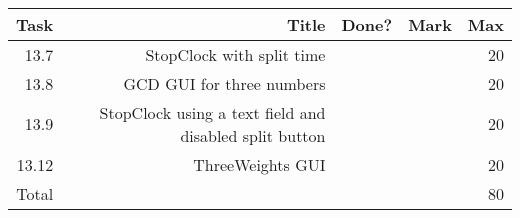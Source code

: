 \\ \\ \\ \noindent\parbox[l]{\textwidth}{
 \\ \\
\begin{tabular}{||r|r|r|r|r||} \hline \hline
Task  & Title                            & Done? & Mark & Max \\ \hline
13.7 & StopClock with split time & & & 20 \\ \hline
13.8 & GCD GUI for three numbers & & & 20 \\ \hline
13.9 & StopClock using a text field and disabled split button & & & 20 \\ \hline
13.12 & ThreeWeights GUI & & & 20 \\ \hline
\hline
Total &                                  &       &      & 80 \\ \hline
\hline
\end{tabular} \\ \\
}
